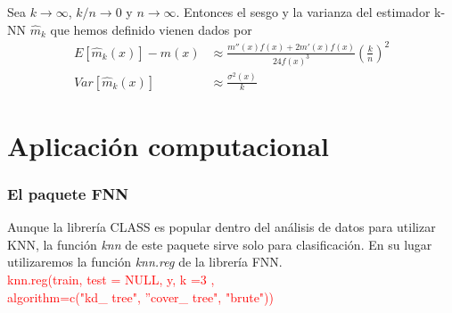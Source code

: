 \documentclass{beamer}
\theoremstyle{definition}
\begin{document}
\begin{frame}
\begin{theorem}[Lai, 1997] 
Sea $k\to \infty$, $k/n\to 0$ y $n\to \infty$. Entonces el sesgo y la varianza del estimador k-NN $\hat{m}_k$ que hemos definido vienen dados por
\begin{align*}
E[\hat{m}_k(x)]-m(x) &\approx \frac{m''(x)f(x)+2m'(x)f(x)}{24f(x)^3}\left(\frac{k}{n}\right)^2\\
Var[\hat{m}_k(x)] &\approx \frac{\sigma^2(x)}{k}
\end{align*}

\end{theorem}
\end{frame}


\section{Aplicación computacional}

\begin{frame}
\frametitle{El paquete FNN}
Aunque la librería CLASS es popular dentro del análisis de datos para utilizar KNN, la función \textit{knn} de este paquete sirve solo para clasificación. En su lugar utilizaremos la función \textit{knn.reg} de la librería FNN. 
\newline
\\
\textcolor{red}{knn.reg(train, test = NULL, y, k =3 , \\ \qquad algorithm=c("kd\_ tree", 
''cover\_ tree", "brute"))}
\newline
\\

\end{frame}
\end{document}
